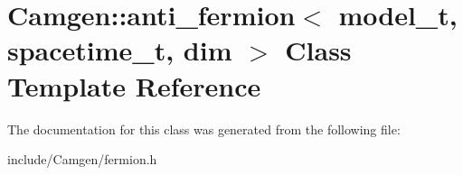 \hypertarget{a00007}{}\section{Camgen\+:\+:anti\+\_\+fermion$<$ model\+\_\+t, spacetime\+\_\+t, dim $>$ Class Template Reference}
\label{a00007}


The documentation for this class was generated from the following file\+:\begin{DoxyCompactItemize}
\item 
include/\+Camgen/fermion.\+h\end{DoxyCompactItemize}
